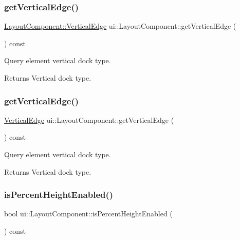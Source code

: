 \subsubsection{\texorpdfstring{get\+Vertical\+Edge()}{getVerticalEdge()}\hspace{0.1cm}{\footnotesize\ttfamily [1/2]}}
{\footnotesize\ttfamily \hyperlink{classui_1_1LayoutComponent_a186978dac32f26bf251942e893999c8f}{Layout\+Component\+::\+Vertical\+Edge} ui\+::\+Layout\+Component\+::get\+Vertical\+Edge (\begin{DoxyParamCaption}{ }\end{DoxyParamCaption}) const}

Query element vertical dock type. \begin{DoxyReturn}{Returns}
Vertical dock type. 
\end{DoxyReturn}
\mbox{\label{classui_1_1LayoutComponent_a1566ea2b1a76ce749a8429e42aa22e2c}} 
\subsubsection{\texorpdfstring{get\+Vertical\+Edge()}{getVerticalEdge()}\hspace{0.1cm}{\footnotesize\ttfamily [2/2]}}
{\footnotesize\ttfamily \hyperlink{classui_1_1LayoutComponent_a186978dac32f26bf251942e893999c8f}{Vertical\+Edge} ui\+::\+Layout\+Component\+::get\+Vertical\+Edge (\begin{DoxyParamCaption}{ }\end{DoxyParamCaption}) const}

Query element vertical dock type. \begin{DoxyReturn}{Returns}
Vertical dock type. 
\end{DoxyReturn}
\mbox{\label{classui_1_1LayoutComponent_a79fe2006defc4f1f69104b415e800825}} 
\subsubsection{\texorpdfstring{is\+Percent\+Height\+Enabled()}{isPercentHeightEnabled()}\hspace{0.1cm}{\footnotesize\ttfamily [1/2]}}
{\footnotesize\ttfamily bool ui\+::\+Layout\+Component\+::is\+Percent\+Height\+Enabled (\begin{DoxyParamCaption}{ }\end{DoxyParamCaption}) const}

